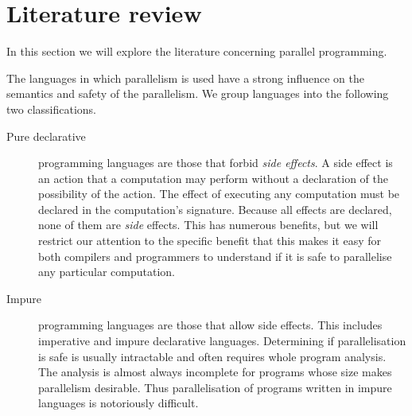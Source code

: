 
%

\section{Literature review}
\label{sec:literature_review}

In this section we will explore the literature concerning parallel
programming.

The languages in which parallelism is used have a strong influence on the
semantics and safety of the parallelism.
We group languages into the following two classifications.

\begin{description}

    \item[Pure declarative] programming languages are those that forbid
    \emph{side effects}.
    A side effect is an action that a computation may perform
    without a declaration of the possibility of the action.
    The effect of executing any computation must be declared in the
    computation's signature.
    Because all effects are declared, none of them are \emph{side} effects.
    This has numerous benefits,
    but we will restrict our attention to the specific benefit
    that this makes it easy for both compilers and programmers to understand
    if it is safe to parallelise any particular computation.

    \item[Impure] programming languages are those that allow side effects.
    This includes imperative and impure declarative languages.
    Determining if parallelisation is safe is usually intractable and often
    requires whole program analysis.
    The analysis is almost always incomplete for programs whose size makes
    parallelism desirable.
    Thus parallelisation of programs written in impure languages is notoriously
    difficult.

\end{description}

